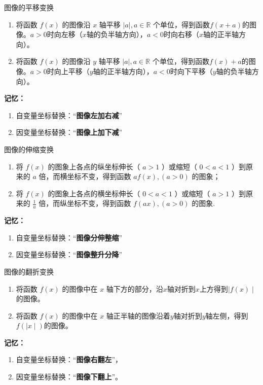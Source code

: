 \vspace{3mm}
\begin{conclusion}{图像的平移变换}{}
\begin{enumerate}
\item 将函数 $f(x)$ 的图像沿 $x$ 轴平移 $\mid a \mid, a \in \mathbb{R}$ 个单位，得到函数$f(x+a)$的图像。$a>0$时向左移（$x$轴的负半轴方向），$a<0$时向右移（$x$轴的正半轴方向）。
\item 将函数 $f(x)$ 的图像沿 $y$ 轴平移 $\mid a \mid, a \in \mathbb{R}$ 个单位，得到函数$f(x) + a$的图像。$a>0$时向上平移（$y$轴的正半轴方向），$a<0$时向下平移（$y$轴的负半轴方向）。
\end{enumerate}
\textbf{记忆：} 
\begin{enumerate}
\item \textcolor{main}{自变量}坐标替换：“\textbf{图像左加右减}”
\item \textcolor{main}{因变量}坐标替换：“\textbf{图像上加下减}”
\end{enumerate}
\end{conclusion}

\vspace{3mm}
\begin{conclusion}{图像的伸缩变换}{}
	\begin{enumerate}
		\item 将 $f(x)$ 的图象上各点的纵坐标伸长（ $a>1$ ）或缩短（ $0<a<1$ ）到原来的 $a$ 倍，而横坐标不变，得到函数 $af(x), (a>0)$ 的图象；
		\item 将 $f(x)$ 的图象上各点的横坐标伸长（ $0<a<1$ ）或缩短（ $a>1$ ）到原来的 $\displaystyle \frac{1}{a}$ 倍，而纵坐标不变，得到函数 $f(ax), (a>0)$ 的图象.
	\end{enumerate}
	\textbf{记忆：} 
	\begin{enumerate}
		\item \textcolor{main}{自变量}坐标替换：“\textbf{图像分伸整缩}”
		\item \textcolor{main}{因变量}坐标替换：“\textbf{图像整升分降}”
	\end{enumerate}
\end{conclusion}
	
\vspace{3mm}
\begin{conclusion}{图像的翻折变换}{}
	\begin{enumerate}
		\item 将函数 $f(x)$ 的图像中在 $x$ 轴下方的部分，沿$x$轴对折到$x$上方得到$\mid f(x) \mid$的图像。
		\item 将函数 $f(x)$ 的图像中在 $x$ 轴正半轴的图像沿着$y$轴对折到$y$轴左侧，得到$f(\mid x \mid)$的图像。
	\end{enumerate}
	\textbf{记忆：} 
	\begin{enumerate}
		\item \textcolor{main}{自变量}坐标替换：“\textbf{图像右翻左}”，
		\item \textcolor{main}{因变量}坐标替换：“\textbf{图像下翻上}”。
	\end{enumerate} 
\end{conclusion}

